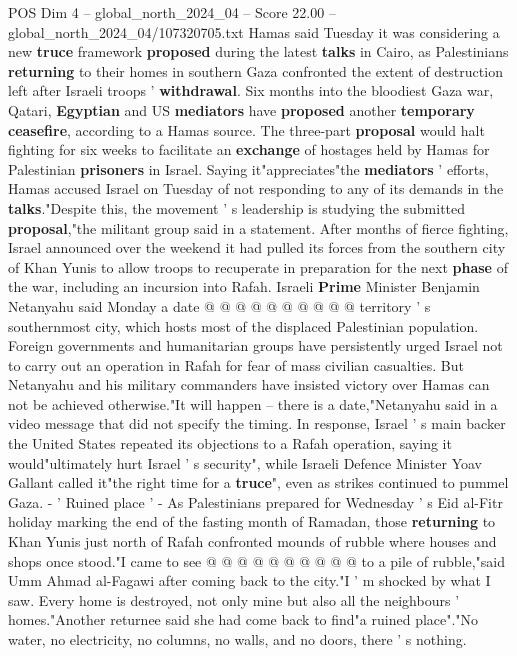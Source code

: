 \begin{textsample}{POS Dim 4 – global\_north\_2024\_04 – Score 22.00 – global\_north\_2024\_04/107320705.txt}  \label{ex:f4_pos_362}
Hamas said Tuesday it was considering a new \textbf{truce} framework \textbf{proposed} during the latest \textbf{talks} in Cairo, as Palestinians \textbf{returning} to their homes in southern Gaza confronted the extent of destruction left after Israeli troops ' \textbf{withdrawal}.
Six months into the bloodiest Gaza war, Qatari, \textbf{Egyptian} and US \textbf{mediators} have \textbf{proposed} another \textbf{temporary} \textbf{ceasefire}, according to a Hamas source.
The three-part \textbf{proposal} would halt fighting for six weeks to facilitate an \textbf{exchange} of hostages held by Hamas for Palestinian \textbf{prisoners} in Israel.
Saying it"appreciates"the \textbf{mediators} ' efforts, Hamas accused Israel on Tuesday of not responding to any of its demands in the \textbf{talks}."Despite this, the movement ' s leadership is studying the submitted \textbf{proposal},"the militant group said in a statement.
After months of fierce fighting, Israel announced over the weekend it had pulled its forces from the southern city of Khan Yunis to allow troops to recuperate in preparation for the next \textbf{phase} of the war, including an incursion into Rafah.
Israeli \textbf{Prime} Minister Benjamin Netanyahu said Monday a date @ @ @ @ @ @ @ @ @ @ territory ' s southernmost city, which hosts most of the displaced Palestinian population.
Foreign governments and humanitarian groups have persistently urged Israel not to carry out an operation in Rafah for fear of mass civilian casualties.
But Netanyahu and his military commanders have insisted victory over Hamas can not be achieved otherwise."It will happen -- there is a date,"Netanyahu said in a video message that did not specify the timing.
In response, Israel ' s main backer the United States repeated its objections to a Rafah operation, saying it would"ultimately hurt Israel ' s security", while Israeli Defence Minister Yoav Gallant called it"the right time for a \textbf{truce}", even as strikes continued to pummel Gaza. - ' Ruined place ' - As Palestinians prepared for Wednesday ' s Eid al-Fitr holiday marking the end of the fasting month of Ramadan, those \textbf{returning} to Khan Yunis just north of Rafah confronted mounds of rubble where houses and shops once stood."I came to see @ @ @ @ @ @ @ @ @ @ to a pile of rubble,"said Umm Ahmad al-Fagawi after coming back to the city."I ' m shocked by what I saw.
Every home is destroyed, not only mine but also all the neighbours ' homes."Another returnee said she had come back to find"a ruined place"."No water, no electricity, no columns, no walls, and no doors, there ' s nothing.

\end{textsample}
